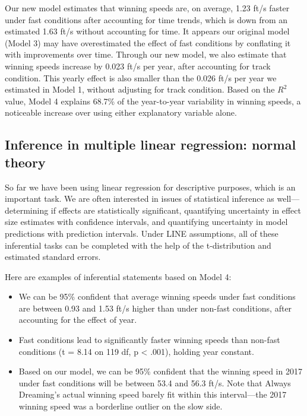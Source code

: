 \documentclass[
]{krantz}
\providecommand{\tightlist}{%
  \setlength{\itemsep}{0pt}\setlength{\parskip}{0pt}}
\begin{document}
Our new model estimates that winning speeds are, on average, 1.23 ft/s faster under fast conditions after accounting for time trends, which is down from an estimated 1.63 ft/s without accounting for time. It appears our original model (Model 3) may have overestimated the effect of fast conditions by conflating it with improvements over time. Through our new model, we also estimate that winning speeds increase by 0.023 ft/s per year, after accounting for track condition. This yearly effect is also smaller than the 0.026 ft/s per year we estimated in Model 1, without adjusting for track condition. Based on the \(R^2\) value, Model 4 explains 68.7\% of the year-to-year variability in winning speeds, a noticeable increase over using either explanatory variable alone.

\hypertarget{multreg-inference}{%
\subsection{Inference in multiple linear regression: normal theory}\label{multreg-inference}}

So far we have been using linear regression for descriptive purposes, which is an important task. We are often interested in issues of statistical inference  as well---determining if effects are statistically significant, quantifying uncertainty in effect size estimates with confidence intervals, and quantifying uncertainty in model predictions with prediction intervals. Under LINE assumptions, all of these inferential tasks can be completed with the help of the t-distribution and estimated standard errors.

Here are examples of inferential statements based on Model 4:

\begin{itemize}
\tightlist
\item
  We can be 95\% confident that average winning speeds under fast conditions are between 0.93 and 1.53 ft/s higher than under non-fast conditions, after accounting for the effect of year.
\item
  Fast conditions lead to significantly faster winning speeds than non-fast conditions (t = 8.14 on 119 df, p \textless{} .001), holding year constant.
\item
  Based on our model, we can be 95\% confident that the winning speed in 2017 under fast conditions will be between 53.4 and 56.3 ft/s. Note that Always Dreaming's actual winning speed barely fit within this interval---the 2017 winning speed was a borderline outlier on the slow side.
\end{itemize}
\end{document}
